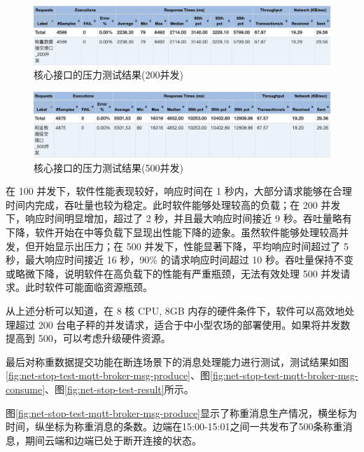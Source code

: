 \begin{figure}
    \centering
    \includegraphics[width=\linewidth]{../source/aws-test/jmeter-test-result-200.png}
    \caption{核心接口的压力测试结果(200并发)}
    \label{fig:jmeter-test-result-200}
\end{figure}

\begin{figure}
    \centering
    \includegraphics[width=\linewidth]{../source/aws-test/jmeter-test-result-500.png}
    \caption{核心接口的压力测试结果(500并发)}
    \label{fig:jmeter-test-result-500}
\end{figure}

在 100 并发下，软件性能表现较好，响应时间在 1 秒内，大部分请求能够在合理时间内完成，吞吐量也较为稳定。此时软件能够处理较高的负载；在 200 并发下，响应时间明显增加，超过了 2 秒，并且最大响应时间接近 9 秒。吞吐量略有下降，软件开始在中等负载下显现出性能下降的迹象。虽然软件能够处理较高并发，但开始显示出压力；在 500 并发下，性能显著下降，平均响应时间超过了 5 秒，最大响应时间接近 16 秒，90\% 的请求响应时间超过 10 秒。吞吐量保持不变或略微下降，说明软件在高负载下的性能有严重瓶颈，无法有效处理 500 并发请求。此时软件可能面临资源瓶颈。

从上述分析可以知道，在 8 核 CPU, 8GB 内存的硬件条件下，软件可以高效地处理超过 200 台电子秤的并发请求，适合于中小型农场的部署使用。如果将并发数提高到 500，可以考虑升级硬件资源。

最后对称重数据提交功能在断连场景下的消息处理能力进行测试，测试结果如图\ref{fig:net-stop-test-mqtt-broker-msg-produce}、图\ref{fig:net-stop-test-mqtt-broker-msg-consume}、图\ref{fig:net-stop-test-result}所示。

图\ref{fig:net-stop-test-mqtt-broker-msg-produce}显示了称重消息生产情况，横坐标为时间，纵坐标为称重消息的条数。边端在15:00-15:01之间一共发布了500条称重消息，期间云端和边端已处于断开连接的状态。

